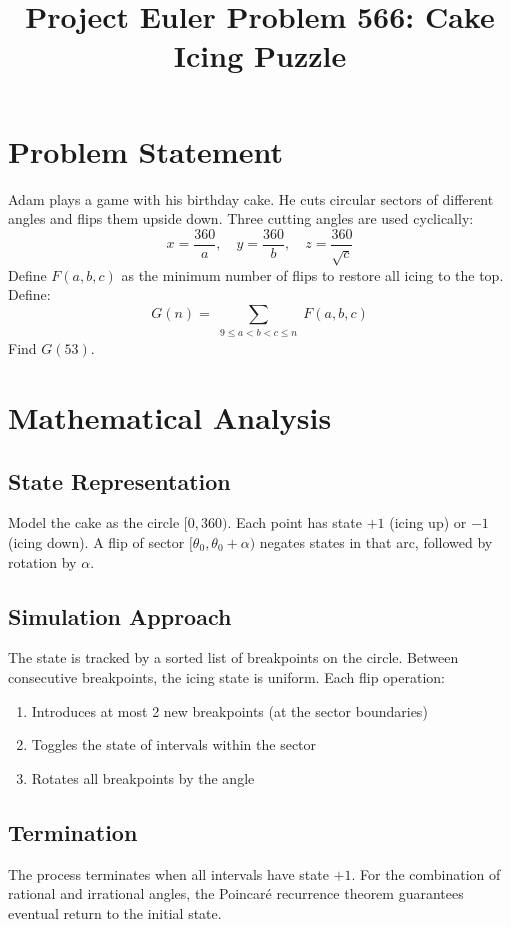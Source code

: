 \documentclass[12pt]{article}
\title{Project Euler Problem 566: Cake Icing Puzzle}
\author{}
\date{}
\begin{document}
\maketitle

\section{Problem Statement}
Adam plays a game with his birthday cake. He cuts circular sectors of different angles and flips them upside down. Three cutting angles are used cyclically:
\[
x = \frac{360}{a}, \quad y = \frac{360}{b}, \quad z = \frac{360}{\sqrt{c}}
\]
Define $F(a,b,c)$ as the minimum number of flips to restore all icing to the top. Define:
\[
G(n) = \sum_{\substack{9 \le a < b < c \le n}} F(a,b,c)
\]
Find $G(53)$.

\section{Mathematical Analysis}

\subsection{State Representation}
Model the cake as the circle $[0, 360)$. Each point has state $+1$ (icing up) or $-1$ (icing down). A flip of sector $[\theta_0, \theta_0 + \alpha)$ negates states in that arc, followed by rotation by $\alpha$.

\subsection{Simulation Approach}
The state is tracked by a sorted list of breakpoints on the circle. Between consecutive breakpoints, the icing state is uniform. Each flip operation:
\begin{enumerate}
    \item Introduces at most 2 new breakpoints (at the sector boundaries)
    \item Toggles the state of intervals within the sector
    \item Rotates all breakpoints by the angle
\end{enumerate}

\subsection{Termination}
The process terminates when all intervals have state $+1$. For the combination of rational and irrational angles, the Poincar\'e recurrence theorem guarantees eventual return to the initial state.
\end{document}
